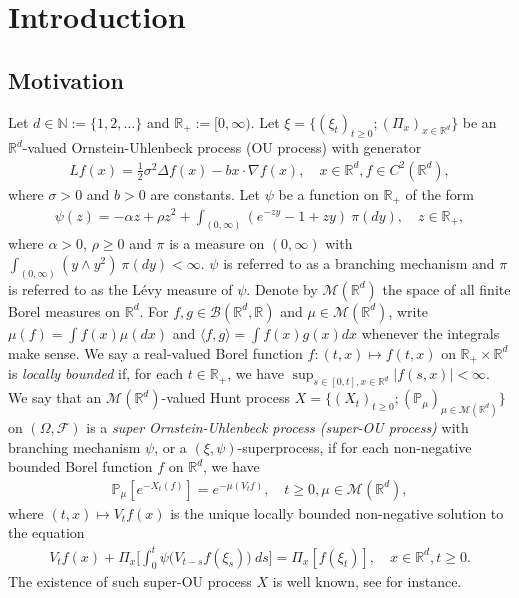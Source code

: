 \documentclass[12pt,a4paper]{amsart}
\theoremstyle{plain}
\theoremstyle{definition}
\numberwithin{equation}{section}
\begin{document}
\section{Introduction}
\subsection{Motivation}
\label{subsec:M}
Let $d \in \mathbb N:= \{1,2,\dots\}$ and $\mathbb R_+:= [0,\infty)$.
Let $\xi=\{(\xi_t)_{t\geq 0}; (\Pi_x)_{x\in \mathbb R^d}\}$ be an $\mathbb R^d$-valued Ornstein-Uhlenbeck process (OU process) with generator
\begin{align}
  Lf(x)
  = \frac{1}{2}\sigma^2\Delta f(x)-b x \cdot \nabla f(x)
  , \quad  x\in \mathbb R^d, f \in C^2(\mathbb R^d),
\end{align}
where $\sigma > 0$ and $b > 0$ are constants.
Let $\psi$ be a function on $\mathbb R_+$ of the form
\begin{align}
  \label{eq: honogeneou branching mechanism}
  \psi(z)
  =- \alpha z + \rho z^2 + \int_{(0,\infty)} (e^{-zy} - 1 + zy)~\pi(dy)
  , \quad  z \in \mathbb R_+,
\end{align}
where $\alpha > 0 $, $\rho \geq0$ and $\pi$ is a measure on $(0,\infty)$ with $\int_{(0,\infty)}(y\wedge y^2)~\pi(dy)< \infty$.
$\psi$ is referred to as a branching mechanism and $\pi$ is referred to as the L\'evy measure of $\psi$.
Denote by $\mathcal M(\mathbb R^d)$ the space of all finite Borel measures on $\mathbb R^d$.
For $f,g\in \mathcal B(\mathbb R^d, \mathbb R)$ and $\mu \in \mathcal M(\mathbb R^d)$,
 write $\mu(f)= \int f(x)\mu(dx)$
and $\langle f, g\rangle = \int f(x)g(x) dx$ whenever the integrals make sense.
We say a real-valued Borel function $f:(t,x)\mapsto f(t,x)$ on $\mathbb R_+\times \mathbb R^d$ is \emph{locally bounded} if, for each $t\in \mathbb R_+$, we have $ \sup_{s\in [0,t],x\in \mathbb R^d} |f(s,x)|<\infty. $
We say that an $\mathcal M(\mathbb R^d)$-valued Hunt process $X = \{(X_t)_{t\geq 0}; (\mathbb{P}_{\mu})_{\mu \in \mathcal M(\mathbb R^d)}\}$
on  $(\Omega, \mathscr{F})$
is a \emph{super Ornstein-Uhlenbeck process (super-OU process)} with branching mechanism $\psi$, or a $(\xi, \psi)$-superprocess, if for each non-negative bounded Borel function $f$ on $\mathbb R^d$, we have
\begin{align}
  \label{eq: def of V_t}
  \mathbb{P}_{\mu}[e^{-X_t(f)}]
  = e^{-\mu(V_tf)}
  , \quad t\geq 0, \mu \in \mathcal M(\mathbb R^d),
\end{align}
where $(t,x) \mapsto V_tf(x)$ is the unique locally bounded non-negative solution to the equation
\begin{align}
  V_tf(x) + \Pi_x \Big[ \int_0^t\psi\big(V_{t-s}f(\xi_s)\big)~ds\Big]
	= \Pi_x [f(\xi_t)]
  , \quad x\in \mathbb R^d, t\geq 0.
\end{align}	
The existence of such super-OU process $X$ is well known, see \cite{Dynkin1993Superprocesses} for instance.
\end{document}
